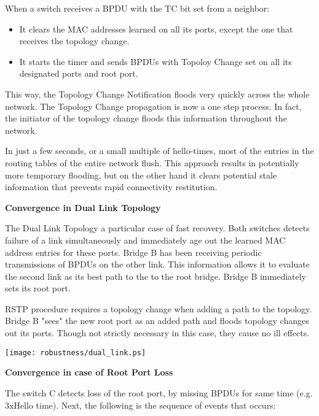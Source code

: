 When a switch receives a BPDU with the TC bit set from a neighbor:

\begin{itemize}
 
	\item It clears the MAC addresses learned on all its ports, except the 
one that receives the topology change. 
	\item It starts the timer and sends BPDUs with Topoloy Change set on all
 its designated ports and root port.
\end{itemize}

This way, the Topology Change Notification floods very quickly across the whole 
network. The Topology Change propagation is now a one step process. In fact, the
initiator of the topology change floods this information throughout the network.

In just a few seconds, or a small multiple of hello-times, most of the entries 
in the routing tables of the entire network flush. This approach results in
potentially more temporary flooding, but on the other hand it clears potential
stale information that prevents rapid connectivity restitution. 



\textbf{Convergence in Dual Link Topology}

The Dual Link Topology a particular case of fast recovery. Both switches detects
 failure of a link  simultaneously and immediately age out the learned MAC
address entries for these ports. Bridge B has been receiving periodic
transmissions of BPDUs on the other link. This information allows it to evaluate
the second link as its best path to the to the root bridge. Bridge B immediately
sets its root port. 

RSTP procedure requires a topology change when adding a path to the topology. 
Bridge B "sees" the new root port as an added path and floods topology changes
out its ports. Though not strictly necessary in this case, they cause no ill
effects.

\begin{center}
        \texttt{[image: robustness/dual\_link.ps]}
        \label{fig:idual_link}
\end{center}

\textbf{Convergence in case of Root Port Loss}

The switch C  detects loss of the root port, by missing BPDUs for same time 
(e.g. 3xHello time). Next, the following is the sequence of events that occurs:

